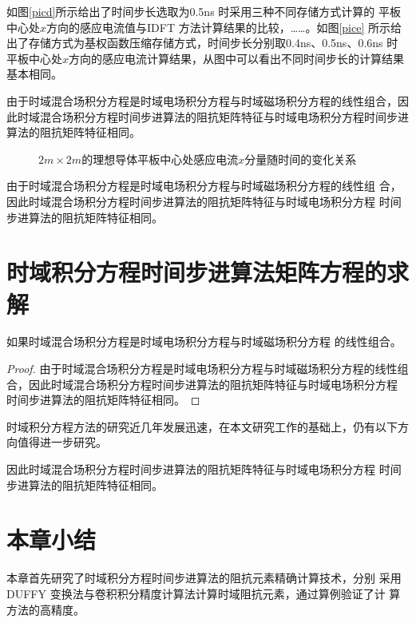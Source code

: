 \documentclass{standalone}
\begin{document}
如图\ref{picd}所示给出了时间步长选取为0.5ns 时采用三种不同存储方式计算的
平板中心处$x$方向的感应电流值与IDFT 方法计算结果的比较，……。如图\ref{pice}
所示给出了存储方式为基权函数压缩存储方式，时间步长分别取0.4ns、0.5ns、0.6ns
时平板中心处$x$方向的感应电流计算结果，从图中可以看出不同时间步长的计算结果基本相同。

由于时域混合场积分方程是时域电场积分方程与时域磁场积分方程的线性组合，因此时域混合场积分方程时间步进算法的阻抗矩阵特征与时域电场积分方程时间步进算法的阻抗矩阵特征相同。

\begin{figure}[h]
	\caption{$2m\times 2m$的理想导体平板中心处感应电流$x$分量随时间的变化关系}
	\label{fig2}
\end{figure}


由于时域混合场积分方程是时域电场积分方程与时域磁场积分方程的线性组
合，因此时域混合场积分方程时间步进算法的阻抗矩阵特征与时域电场积分方程
时间步进算法的阻抗矩阵特征相同。
\section{时域积分方程时间步进算法矩阵方程的求解}

\begin{theorem}
	如果时域混合场积分方程是时域电场积分方程与时域磁场积分方程
	的线性组合。
\end{theorem}
\begin{proof}
	由于时域混合场积分方程是时域电场积分方程与时域磁场积分方程的线性组
	合，因此时域混合场积分方程时间步进算法的阻抗矩阵特征与时域电场积分方程
	时间步进算法的阻抗矩阵特征相同。
\end{proof}
\begin{corollary}
	时域积分方程方法的研究近几年发展迅速，在本文研究工作的基础上，仍有以下方向值得进一步研究。
\end{corollary}
\begin{lemma}
	因此时域混合场积分方程时间步进算法的阻抗矩阵特征与时域电场积分方程
	时间步进算法的阻抗矩阵特征相同。
\end{lemma}

\section{本章小结}
本章首先研究了时域积分方程时间步进算法的阻抗元素精确计算技术，分别
采用DUFFY 变换法与卷积积分精度计算法计算时域阻抗元素，通过算例验证了计
算方法的高精度。
\end{document}
